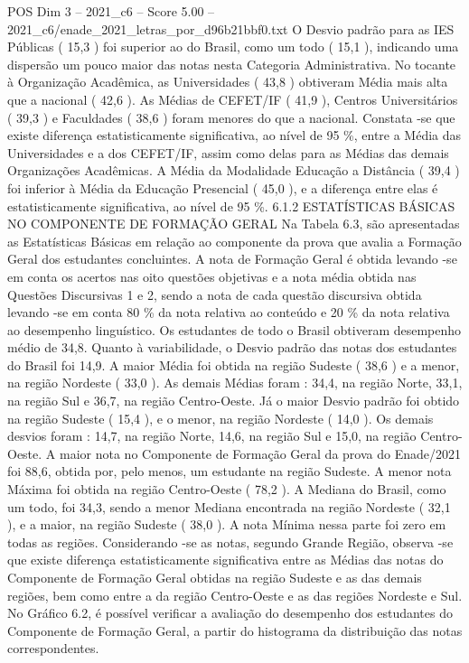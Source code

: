 \begin{textsample}{POS Dim 3 – 2021\_c6 – Score 5.00 – 2021\_c6/enade\_2021\_letras\_por\_d96b21bbf0.txt}
O Desvio padrão para as IES Públicas ( 15,3 ) foi superior ao do Brasil, como um todo ( 15,1 ), indicando uma dispersão um pouco maior das notas nesta Categoria Administrativa.
No tocante à Organização Acadêmica, as Universidades ( 43,8 ) obtiveram Média mais alta que a nacional ( 42,6 ).
As Médias de CEFET/IF ( 41,9 ), Centros Universitários ( 39,3 ) e Faculdades ( 38,6 ) foram menores do que a nacional.
Constata -se que existe diferença estatisticamente significativa, ao nível de 95 \%, entre a Média das Universidades e a dos CEFET/IF, assim como delas para as Médias das demais Organizações Acadêmicas.
A Média da Modalidade Educação a Distância ( 39,4 ) foi inferior à Média da Educação Presencial ( 45,0 ), e a diferença entre elas é estatisticamente significativa, ao nível de 95 \%. 6.1.2 ESTATÍSTICAS BÁSICAS NO COMPONENTE DE FORMAÇÃO GERAL Na Tabela 6.3, são apresentadas as Estatísticas Básicas em relação ao componente da prova que avalia a Formação Geral dos estudantes concluintes.
A nota de Formação Geral é obtida levando -se em conta os acertos nas oito questões objetivas e a nota média obtida nas Questões Discursivas 1 e 2, sendo a nota de cada questão discursiva obtida levando -se em conta 80 \% da nota relativa ao conteúdo e 20 \% da nota relativa ao desempenho linguístico.
Os estudantes de todo o Brasil obtiveram desempenho médio de 34,8.
Quanto à variabilidade, o Desvio padrão das notas dos estudantes do Brasil foi 14,9.
A maior Média foi obtida na região Sudeste ( 38,6 ) e a menor, na região Nordeste ( 33,0 ).
As demais Médias foram : 34,4, na região Norte, 33,1, na região Sul e 36,7, na região Centro-Oeste.
Já o maior Desvio padrão foi obtido na região Sudeste ( 15,4 ), e o menor, na região Nordeste ( 14,0 ).
Os demais desvios foram : 14,7, na região Norte, 14,6, na região Sul e 15,0, na região Centro-Oeste.
A maior nota no Componente de Formação Geral da prova do Enade/2021 foi 88,6, obtida por, pelo menos, um estudante na região Sudeste.
A menor nota Máxima foi obtida na região Centro-Oeste ( 78,2 ).
A Mediana do Brasil, como um todo, foi 34,3, sendo a menor Mediana encontrada na região Nordeste ( 32,1 ), e a maior, na região Sudeste ( 38,0 ).
A nota Mínima nessa parte foi zero em todas as regiões.
Considerando -se as notas, segundo Grande Região, observa -se que existe diferença estatisticamente significativa entre as Médias das notas do Componente de Formação Geral obtidas na região Sudeste e as das demais regiões, bem como entre a da região Centro-Oeste e as das regiões Nordeste e Sul.
No Gráfico 6.2, é possível verificar a avaliação do desempenho dos estudantes do Componente de Formação Geral, a partir do histograma da distribuição das notas correspondentes.

\end{textsample}
